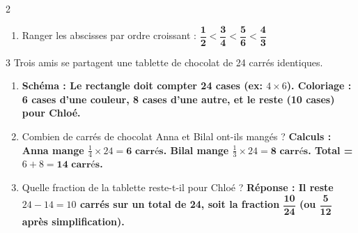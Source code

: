 \documentclass[a4paper]{book}
\begin{document}
{\begin{exerciceNote}{2}
\begin{enumerate}
\begin{center}
            \end{center}
            
            \item Ranger les abscisses par ordre croissant : \textbf{$\mathbf{\dfrac{1}{2} < \dfrac{3}{4} < \dfrac{5}{6} < \dfrac{4}{3}}$}
        \end{enumerate}
    \end{exerciceNote}
    
        
    \begin{exerciceNote}{3}
        Trois amis se partagent une tablette de chocolat de 24 carrés identiques.
        \begin{enumerate}
            \item \textbf{Schéma : Le rectangle doit compter 24 cases (ex: $4 \times 6$). Coloriage : 6 cases d'une couleur, 8 cases d'une autre, et le reste (10 cases) pour Chloé.}
            \item Combien de carrés de chocolat Anna et Bilal ont-ils mangés ? \newline
            \textbf{Calculs : Anna mange $\frac{1}{4} \times 24 = \mathbf{6\text{ carrés}}$. Bilal mange $\frac{1}{3} \times 24 = \mathbf{8\text{ carrés}}$. Total = $6 + 8 = \mathbf{14\text{ carrés}}$.}
            \item Quelle fraction de la tablette reste-t-il pour Chloé ? \newline
            \textbf{Réponse : Il reste $24 - 14 = 10$ carrés sur un total de 24, soit la fraction $\mathbf{\dfrac{10}{24}}$ (ou $\mathbf{\dfrac{5}{12}}$ après simplification).}
        \end{enumerate}
    \end{exerciceNote} 
    
}
\end{document}
